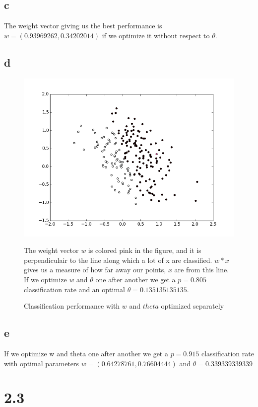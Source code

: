 \documentclass[11pt,a4paper]{article}
\begin{document}
\subsection*{c}
The weight vector giving us the best performance is $w=(0.93969262,  0.34202014)$ if we optimize it without respect to $\theta$.
\subsection*{d}
\begin{figure}[h]
  \begin{centering}
  \includegraphics[width=\textwidth]{Classification performance with w and theta optimized separately.png}
  \caption{Classification performance with $w$ and $theta$ optimized separately}
  \end{centering}
The weight vector $w$ is colored pink in the figure, and it is perpendiculair to the line along which a lot of x are classified. $w*x$ gives us a measure of how far away our points, $x$ are from this line.
If we optimize $w$ and $\theta$ one after another we get a  $p = 0.805$  classification rate and an optimal $\theta = 0.135135135135$.
\end{figure}
\newpage
\subsection*{e}
If we optimize w and theta one after another we get a  $p = 0.915$ classification rate with optimal parameters $w = (0.64278761,  0.76604444)$ and $\theta = 0.339339339339$
\newpage
\section*{2.3}
\end{document}
